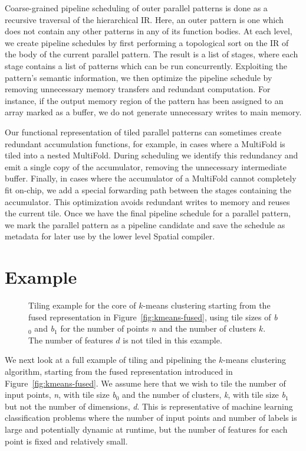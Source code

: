 Coarse-grained pipeline scheduling of outer parallel patterns is done as a recursive traversal of the hierarchical IR. Here, an outer pattern is one which does not
contain any other patterns in any of its function bodies.
At each level, we create pipeline schedules by first performing a topological sort on the IR
of the body of the current parallel pattern. The result is a list of stages,
where each stage contains a list of patterns which can be run concurrently.
Exploiting the pattern's semantic information, we then
optimize the pipeline schedule by removing unnecessary memory transfers and redundant computation.
For instance, if the output memory region of the pattern has been assigned to an array marked as a buffer,
we do not generate unnecessary writes to main memory.

Our functional representation of tiled parallel patterns
can sometimes create redundant accumulation functions, for example, in cases where a MultiFold is tiled into a nested MultiFold. During scheduling we identify
this redundancy and emit a single copy of the accumulator, removing the unnecessary intermediate buffer.
Finally, in cases where the accumulator of a MultiFold cannot completely fit on-chip, we add a special
forwarding path between the stages containing the accumulator. This optimization avoids redundant writes to memory and
reuses the current tile.
Once we have the final pipeline schedule for a parallel pattern,
we mark the parallel pattern as a pipeline candidate and save the
schedule as metadata for later use by the lower level Spatial compiler.

\section{Example}

\begin{figure}\small\centering

\caption{Tiling example for the core of $k$-means clustering starting from the
fused representation in Figure~\ref{fig:kmeans-fused}, using tile sizes of
\emph{b$_0$} and \emph{b$_1$} for the number of points $n$ and the number of
clusters $k$. The number of features $d$ is not tiled in this example.}
\label{fig:kmeans-example}
\end{figure}

We next look at a full example of tiling and pipelining
the $k$-means clustering algorithm, starting from the fused representation
introduced in Figure~\ref{fig:kmeans-fused}. We assume here that we wish
to tile the number of input points, \emph{n}, with tile size \emph{b$_0$} and
the number of clusters, \emph{k}, with tile size \emph{b$_1$} but not the
number of dimensions, \emph{d}. This is representative of machine learning
classification problems where the number of input points and number of labels is
large and potentially dynamic at runtime,
but the number of features for each point is fixed and relatively small.

